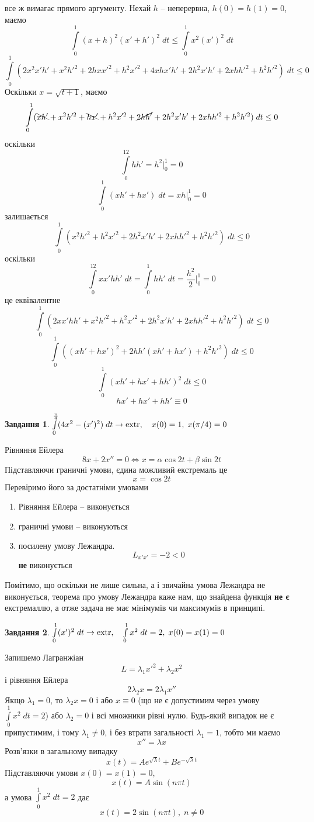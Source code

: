 \documentclass[12pt]{article} %
\newtheorem{prob}{Завдання}
\newcommand{\dt}{\;dt}
\let\oldint\int
\renewcommand{\int}{\oldint\limits}
\newcommand{\extr}{\mbox{\normalfont extr}}
\begin{document}
	все ж вимагає прямого аргументу. Нехай $h$ -- неперервна, $h(0)=h(1)=0$, маємо
	\[\int_0^1(x+h)^2(x'+h')^2\dt\leq\int_0^1x^2(x')^2\dt\]
	\[\int_0^1(2x^2x'h'+x^2h'^2+2hxx'^2+h^2x'^2+4xhx'h'+2h^2x'h'+2xhh'^2+h^2h'^2)\dt\leq0\]
	Оскільки $x=\sqrt{t+1}$, маємо
	\[\int_0^1(\bcancel{xh'}+x^2h'^2+\bcancel{hx'}+h^2x'^2+\cancel{2hh'}+{2h^2x'h'}+2xhh'^2+h^2h'^2)\dt\leq0\]
	оскільки
	\[\int_0^12hh'=h^2\bigg|_0^1=0\]
	\[\int_0^1(xh'+hx')\dt=xh\bigg|_0^1=0\]
	залишається
	\[\int_0^1(x^2h'^2+h^2x'^2+{2h^2x'h'}+2xhh'^2+h^2h'^2)\dt\leq0\]
	оскільки 
	\[\int_0^12xx'hh'\dt=\int_0^1hh'\dt=\frac{h^2}{2}\bigg|_0^1=0\]
	це еквівалентне
	\[\int_0^1(2xx'hh'+x^2h'^2+h^2x'^2+{2h^2x'h'}+2xhh'^2+h^2h'^2)\dt\leq0\]
	\[\int_0^1((xh'+hx')^2+2hh'(xh'+hx')+h^2h'^2)\dt\leq0\]
	\[\int_0^1(xh'+hx'+hh')^2\dt\leq0\]
	\[hx'+hx'+hh'\equiv0\]
\begin{prob}{}\; $\int_0^{\frac{\pi}{4}}(4x^2-(x')^2)\dt\to\extr,\quad x(0)=1,\;x(\pi/4)=0$\end{prob}
	Рівняння Ейлера
	\[8x+2x''=0\iff x=\alpha\cos2t+\beta\sin2t\]
	Підставляючи граничні умови, єдина можливий екстремаль це
	\[x=\cos2t\]
	Перевіримо його за достатніми умовами
	\begin{enumerate}
		\item Рівняння Ейлера -- виконується
		\item граничні умови -- виконуються
		\item посилену умову Лежандра.
			\[L_{x'x'}=-2<0\]
			\textbf{не} виконується
	\end{enumerate}
	Помітимо, що оскільки не лише сильна, а і звичайна умова Лежандра не виконується, теорема про умову Лежандра каже нам,
	що знайдена функція \textbf{не є} екстремаллю, а отже задача не має мінімумів чи максимумів в принципі.
\begin{prob}{}\; $\int_0^1(x')^2\dt\to\extr,\quad\int_0^1x^2\dt=2,\;x(0)=x(1)=0$\end{prob}
	Запишемо Лагранжіан
	\[L=\lambda_1x'^2+\lambda_2x^2\]
	і рівняння Ейлера
	\[2\lambda_2x=2\lambda_1x''\]
	Якщо $\lambda_1=0$, то $\lambda_2x=0$ і або $x\equiv0$ (що не є допустимим через умову $\int_0^1x^2\dt=2$)
	або $\lambda_2=0$ і всі множники рівні нулю. Будь-який випадок не є припустимим, і тому $\lambda_1\neq0$,
	і без втрати загальності $\lambda_1=1$, тобто ми маємо
	\[x''=\lambda x\]
	Розв’язки в загальному випадку
	\[x(t)=Ae^{\sqrt{\lambda}t}+Be^{-\sqrt{\lambda}t}\]
	Підставляючи умови $x(0)=x(1)=0$,
	\[x(t)=A\sin(n\pi t)\]
	а умова $\int_0^1x^2\dt=2$ дає
	\[x(t)={2}\sin(n\pi t),\;n\neq0\]
\end{document}
